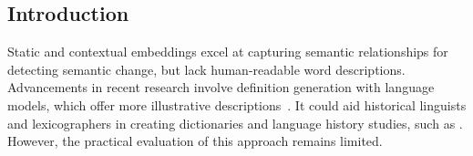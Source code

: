 \documentclass[a0,portrait]{a0poster}
\begin{document}
\begin{multicols}{2} %

%
%
%
%


\color{SaddleBrown} %

\section*{Introduction}

Static and contextual embeddings excel at capturing semantic relationships for detecting semantic change,
but lack human-readable word descriptions.
Advancements in recent research involve definition generation with language models, which offer more illustrative descriptions~\cite{DefinitionGenerationMainArticle,fedorova-etal-2024-definition}.
It could aid historical linguists and lexicographers in creating dictionaries and language history studies, such as .
However, the practical evaluation of this approach remains limited.


\end{multicols}
\end{document}
